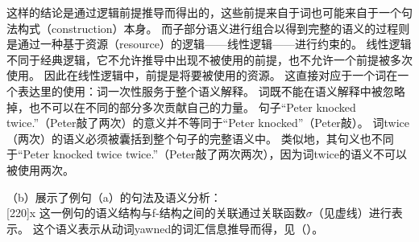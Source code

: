 这样的结论是通过逻辑前提推导而得出的，这些前提来自于词也可能来自于一个句法构式（construction）本身。
而子部分语义进行组合以得到完整的语义的过程则是通过一种基于资源（resource）的逻辑——线性逻辑——进行约束的。
线性逻辑不同于经典逻辑，它不允许推导中出现不被使用的前提，也不允许一个前提被多次使用。
因此在线性逻辑中，前提是将要被使用的资源。
这直接对应于一个词在一个表达里的使用：词一次性服务于整个语义解释。
词既不能在语义解释中被忽略掉，也不可以在不同的部分多次贡献自己的力量。
句子“Peter knocked twice.”（Peter敲了两次）的意义并不等同于“Peter knocked”（Peter敲）。
词twice（两次）的语义必须被囊括到整个句子的完整语义中。
类似地，其句义也不同于“Peter knocked twice twice.”（Peter敲了两次两次），因为词twice的语义不可以被使用两次。

（b）展示了例句（a）的句法及语义分析：
\eal
{}
\ex ~\\[-\baselineskip]
\hspace*{-2em}
{}%
\hspace*{3em}%
{}%
\hspace*{2em}%
\Aput*{$\phi$}
[220]{x}
\Bput*{$\sigma$}
\zl
% 
这一例句的语义结构与f-结构之间的关联通过关联函数$\sigma$（见虚线）进行表示。
这个语义表示从动词yawned的词汇信息推导而得，见（）。

